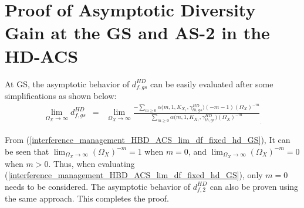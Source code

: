 \section{Proof of Asymptotic Diversity Gain at the GS and AS-2 in the HD-ACS} \label{interference_management_HBD_ACS_coro_lim_df_fixed_hd_proof}
At GS, the asymptotic behavior of $d_{f,gs}^{HD}$ can be easily evaluated after some simplifications as shown below:
\begin{eqnarray} \label{interference_management_HBD_ACS_lim_df_fixed_hd_GS}
\lim_{\Omega_X \to \infty} d_{f,gs}^{HD} & = & \lim_{\Omega_X \to \infty} \frac{ -\sum_{m\geq0} \alpha\big(m,1,K_{X_1},\gamma_{th,gs}^{HD}\big) (-m-1) (\Omega_{X})^{-m} }{\sum_{m\geq0} \alpha\big(m,1,K_{X_1},\gamma_{th,gs}^{HD}\big) (\Omega_{X})^{-m} }_. 
\end{eqnarray}

From (\ref{interference_management_HBD_ACS_lim_df_fixed_hd_GS}), It can be seen that $\lim_{\Omega_X\to\infty} (\Omega_{X})^{-m}=1 $ when $m=0$, and $\lim_{\Omega_X\to\infty} (\Omega_{X})^{-m} = 0 $ when $m>0$. Thus, when evaluating (\ref{interference_management_HBD_ACS_lim_df_fixed_hd_GS}), only $m=0$ needs to be considered. The asymptotic behavior of $d_{f,2}^{HD}$ can also be proven using the same approach. This completes the proof.
